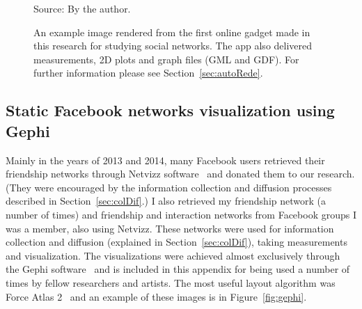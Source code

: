 \begin{apendicesenv}
\begin{figure}[h!]
\begin{center}
\caption{An example image rendered from the first online gadget made in this research for studying social networks.
	The app also delivered measurements, 2D plots and graph files (GML and GDF).
	For further information please see Section~\ref{sec:autoRede}.}
\label{fig:autoRede}
\begin{flushleft}\footnotesize
Source: By the author.\
\end{flushleft}
\end{center}
\end{figure}

\subsection{Static Facebook networks visualization using Gephi}\label{sec:gephi}
Mainly in the years of 2013 and 2014, many Facebook users retrieved their friendship networks through Netvizz software~\cite{netvizz}
and donated them to our research.
(They were encouraged by the information collection and diffusion processes described in Section~\ref{sec:colDif}.)
I also retrieved my friendship network (a number of times) 
and friendship and interaction networks from Facebook groups I was a member, also using Netvizz.
These networks were used for information collection and diffusion (explained in Section~\ref{sec:colDif}),
taking measurements and visualization.
The visualizations were achieved almost exclusively through the Gephi software~\cite{gephi}
and is included in this appendix for being used a number of times by fellow researchers and artists.
The most useful layout algorithm was Force Atlas 2~\cite{fa2} and an example of these images is in Figure~\ref{fig:gephi}.



\end{apendicesenv}

